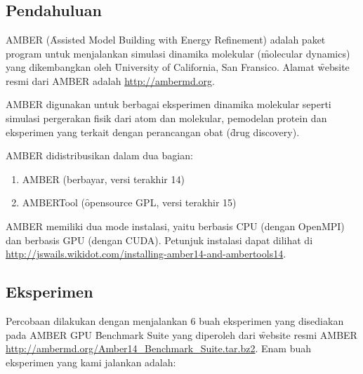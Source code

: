 \chapter{\topikEmpat}

\section{Pendahuluan}

AMBER (\f{Assisted Model Building with Energy Refinement}) adalah paket program untuk menjalankan simulasi dinamika molekular (\f{molecular dynamics}) yang dikembangkan oleh \f{University of California}, San Fransico. Alamat \f{website} resmi dari AMBER adalah \url{http://ambermd.org}.

AMBER digunakan untuk berbagai eksperimen dinamika molekular seperti simulasi pergerakan fisik dari atom dan molekular, pemodelan protein dan eksperimen yang terkait dengan perancangan obat (\f{drug discovery}).

AMBER didistribusikan dalam dua bagian:

\begin{enumerate}
	\item AMBER (berbayar, versi terakhir 14)
	\item AMBERTool (\f{opensource} GPL, versi terakhir 15)
\end{enumerate}

AMBER memiliki dua mode instalasi, yaitu berbasis CPU (dengan OpenMPI) dan berbasis GPU (dengan CUDA). Petunjuk instalasi dapat dilihat di \url{http://jswails.wikidot.com/installing-amber14-and-ambertools14}.


\section{Eksperimen}

Percobaan dilakukan dengan menjalankan 6 buah eksperimen yang disediakan pada AMBER GPU \f{Benchmark Suite} yang diperoleh dari \f{website} resmi AMBER \url{http://ambermd.org/Amber14_Benchmark_Suite.tar.bz2}. Enam buah eksperimen yang kami jalankan adalah:

